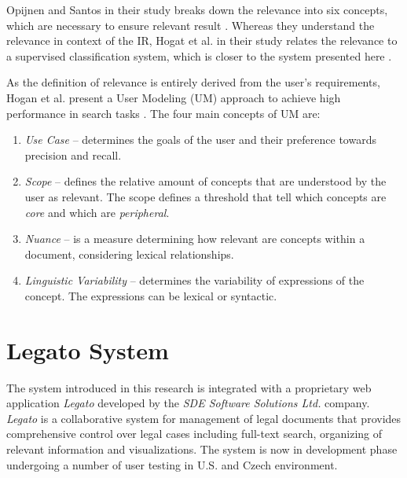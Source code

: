 \documentclass[
  digital, %
  notable,   %
  nolof,     %
  nolot,     %
]{fithesis3}
\begin{document}
Opijnen and Santos in their study  breaks down the relevance into six concepts, which are necessary to ensure relevant result \cite{vanOpijnen2017relevance}.
Whereas they understand the relevance in context of the IR, Hogat et al. in their study  relates the relevance to a supervised classification system, which is closer to the system presented here \cite{brassil2009usermodeling}.


As the definition of relevance is entirely derived from the user's requirements, Hogan et al. present a User Modeling (UM) approach to achieve high performance in search tasks \cite{brassil2009usermodeling}.
The four main concepts of UM are:
\begin{enumerate}
\item \textit{Use Case} -- determines the goals of the user and their preference towards precision and recall.
\item \textit{Scope} -- defines the relative amount of concepts that are understood by the user as relevant. The scope defines a threshold that tell which concepts are \textit{core} and which are \textit{peripheral}.
\item \textit{Nuance} -- is a measure determining how relevant are concepts within a document, considering lexical relationships.
\item \textit{Linguistic Variability} -- determines the variability of expressions of the concept. The expressions can be lexical or syntactic.
\end{enumerate}


\chapter{Legato System}
\label{chp:legato}
The system introduced in this research is integrated with a proprietary web application \textit{Legato} developed by the \textit{SDE Software Solutions Ltd.} company.
\textit{Legato} is a collaborative system for management of legal documents that provides comprehensive control over legal cases including full-text search, organizing of relevant information and visualizations.
The system is now in development phase undergoing a number of user testing in U.S. and Czech environment.
\end{document}
